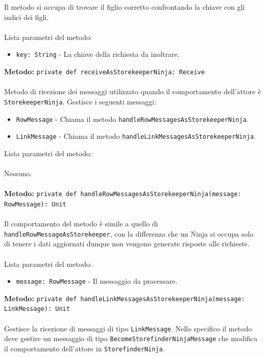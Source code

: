 \documentclass[a4paper]{article}
\begin{document}
			Il metodo si occupa di trovare il figlio corretto confrontando la chiave con gli indici dei figli.
			\\ \\
			Lista parametri del metodo:
			\begin{itemize}
				\item \texttt{key: String} - La chiave della richiesta da inoltrare.
			\end{itemize}
		\textbf{Metodo: }\texttt{private def receiveAsStorekeeperNinja: Receive}
			\\ \\
			Metodo di ricezione dei messaggi utilizzato quando il comportamento dell'attore è \texttt{StorekeeperNinja}. Gestisce i seguenti messaggi:
			\begin{itemize}
				\item \texttt{RowMessage} - Chiama il metodo \texttt{handleRowMessagesAsStorekeeperNinja}.
				\item \texttt{LinkMessage} - Chiama il metodo \texttt{handleLinkMessagesAsStorekeeperNinja}.
			\end{itemize}
			Lista parametri del metodo:
			\\ \\
			Nessuno.
			\\ \\		
		\textbf{Metodo: }\texttt{private def handleRowMessagesAsStorekeeperNinja(message: RowMessage): Unit}
			\\ \\
			Il comportamento del metodo è simile a quello di \texttt{handleRowMessageAsStorekeeper}, con la differenza che un Ninja si occupa solo di tenere i dati aggiornati dunque non vengono generate risposte alle richieste.
			\\ \\
			Lista parametri del metodo:
			\begin{itemize}
				\item \texttt{message: RowMessage} - Il messaggio da processare.
			\end{itemize}			
		\textbf{Metodo: }\texttt{private def handleLinkMessagesAsStorekeeperNinja(message: LinkMessage): Unit}
			\\ \\
			Gestisce la ricezione di messaggi di tipo \texttt{LinkMessage}. Nello specifico il metodo deve gestire un messaggio di tipo \texttt{BecomeStorefinderNinjaMessage} che modifica il comportamento dell'attore in \texttt{StorefinderNinja}.
			\\ \\
\end{document}
